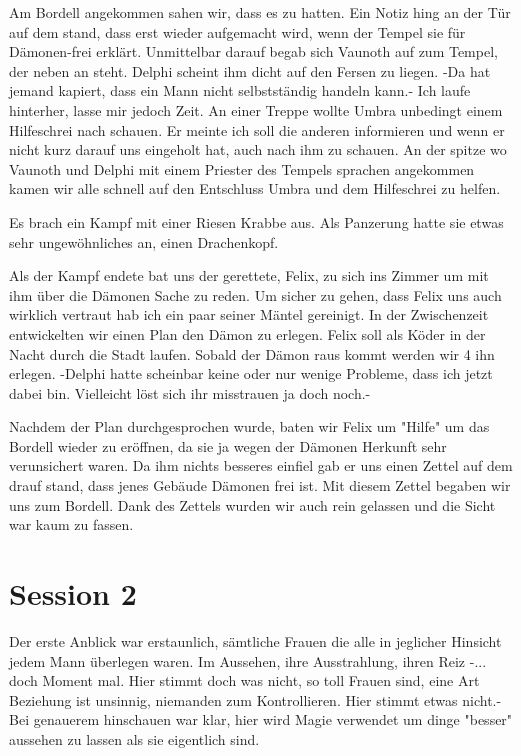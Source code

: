 \documentclass[10pt,twoside,twocolumn,openany]{book}
\begin{document}
	Am Bordell angekommen sahen wir, dass es zu hatten. Ein Notiz hing an der Tür auf dem stand, dass erst wieder aufgemacht wird, wenn der Tempel sie für Dämonen-frei erklärt. Unmittelbar darauf begab sich Vaunoth auf zum Tempel, der neben an steht. Delphi scheint ihm dicht auf den Fersen zu liegen. -Da hat jemand kapiert, dass ein Mann nicht selbstständig handeln kann.- Ich laufe hinterher, lasse mir jedoch Zeit. An einer Treppe wollte Umbra unbedingt einem Hilfeschrei nach schauen. Er meinte ich soll die anderen informieren und wenn er nicht kurz darauf uns eingeholt hat, auch nach ihm zu schauen. An der spitze wo Vaunoth und Delphi mit einem Priester des Tempels sprachen angekommen kamen wir alle schnell auf den Entschluss Umbra und dem Hilfeschrei zu helfen. 
	
	Es brach ein Kampf mit einer Riesen Krabbe aus. Als Panzerung hatte sie etwas sehr ungewöhnliches an, einen Drachenkopf. 
	
	Als der Kampf endete bat uns der gerettete, Felix, zu sich ins Zimmer um mit ihm über die Dämonen Sache zu reden. Um sicher zu gehen, dass Felix uns auch wirklich vertraut hab ich ein paar seiner Mäntel gereinigt. In der Zwischenzeit entwickelten wir einen Plan den Dämon zu erlegen. Felix soll als Köder in der Nacht durch die Stadt laufen. Sobald der Dämon raus kommt werden wir 4 ihn erlegen. -Delphi hatte scheinbar keine oder nur wenige Probleme, dass ich jetzt dabei bin. Vielleicht löst sich ihr misstrauen ja doch noch.-
	
	Nachdem der Plan durchgesprochen wurde, baten wir Felix um "Hilfe" um das Bordell wieder zu eröffnen, da sie ja wegen der Dämonen Herkunft sehr verunsichert waren. Da ihm nichts besseres einfiel gab er uns einen Zettel auf dem drauf stand, dass jenes Gebäude Dämonen frei ist. Mit diesem Zettel begaben wir uns zum Bordell. Dank des Zettels wurden wir auch rein gelassen und die Sicht war kaum zu fassen.
	
	\chapter{Session 2}
	Der erste Anblick war erstaunlich, sämtliche Frauen die alle in jeglicher Hinsicht jedem Mann überlegen waren. Im Aussehen, ihre Ausstrahlung, ihren Reiz -... doch Moment mal. Hier stimmt doch was nicht, so toll Frauen sind, eine Art Beziehung ist unsinnig, niemanden zum Kontrollieren. Hier stimmt etwas nicht.- Bei genauerem hinschauen war klar, hier wird Magie verwendet um dinge "besser" aussehen zu lassen als sie eigentlich sind. 
	
\end{document}
